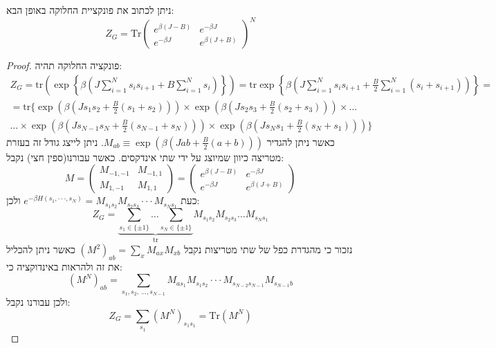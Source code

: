 \documentclass{tstextbook}
\begin{document}
\begin{proposition}
ניתן לכתוב את פונקציית החלוקה באופן הבא:
$$Z_{G}=\mathrm{Tr}\begin{pmatrix}e^{ \beta(J-B) } & e^{ -\beta J } \\e^{ -\beta J } & e^{ \beta(J+B) }
\end{pmatrix}^{N}$$

\end{proposition}
\begin{proof}
פונקציה החלוקה תהיה:
\begin{gather*}Z_{G}=\mathrm{tr}\left( \exp \left\{  \beta\left( J\sum_{i=1}^{N} s_{i}s_{i+1} + B\sum_{i=1}^{N} s_{i} \right)  \right\} \right)=\mathrm{tr} \exp\left\{\beta\left(J\sum_{i=1}^{N}s_{i}s_{i+1}+\frac{B}{2}\sum_{i=1}^{N}\left(s_{i}+s_{i+1}\right)\right)\right\}=  \\=\mathrm{tr}\Bigg\{\exp\left(\beta\left(J s_{1}s_{2}+\frac{B}{2}\left(s_{1}+s_{2}\right)\right)\right)\times\exp\left(\beta\left(J s_{2}s_{3}+\frac{B}{2}\left(s_{2}+s_{3}\right)\right)\right)\times\ldots \\\dots \times \exp\left(\beta\left(J s_{N-1}s_{N}+{\frac{B}{2}}\left(s_{N-1}+s_{N}\right)\right)\right)\times\exp\left(\beta\left(J s_{N}s_{1}+{\frac{B}{2}}\left(s_{N}+s_{1}\right)\right)\right)\Bigg\}
\end{gather*}
כאשר ניתן להגדיר \(M_{a b}\equiv\exp\left(\beta\left(J a b+{\textstyle{\frac{B}{2}}}\left(a+b\right)\right)\right)\). ניתן לייצג גודל זה בעזרת מטריצה כיוון שמיוצג על ידי שתי אינדקסים. כאשר עבורנו(ספין חצי) נקבל:
$$M=\begin{pmatrix}M_{-1,-1} & M_{-1,1} \\M_{1,-1} & M_{1,1}\end{pmatrix}=\begin{pmatrix}e^{ \beta(J-B) } & e^{ -\beta J } \\e^{ -\beta J } & e^{ \beta(J+B) }
\end{pmatrix}$$
כעת \(e^{-\beta H(s_{1},\cdot\cdot\cdot,s_{N})}=M_{s_{1}s_{2}}M_{s_{2}s_{3}}\cdot\cdot\cdot M_{s_{N}s_{1}}\) ולכן:
$$Z_{G}=\underbrace{ \sum_{s_{1}\in \{ \pm  1\}} \dots \sum_{s_{N}\in \{ \pm  1\}} }_{ \mathrm{tr} } M_{s_{1}s_{2}}M_{s_{2}s_{3}}\dots M_{s_{N}s_{1}}$$
נזכור כי מהגדרת כפל של שתי מטריצות נקבל \((M^{2})_{a b}=\sum_{x}M_{a x}M_{x b}\) כאשר ניתן להכליל את זה ולהראות באינדוקציה כי:
$$(M^{N})_{a b}=\sum_{s_{1},s_{2},\,\ldots,s_{N-1}}M_{a s_{1}}M_{s_{1}s_{2}}\cdot\cdot\cdot M_{s_{N-2}s_{N-1}}M_{s_{N-1}b}$$
ולכן עבורנו נקבל:
$$Z_{G}=\sum_{s_{1}}(M^{N})_{s_{1}s_{1}}=\mathrm{Tr}(M^{N})$$

\end{proof}
\end{document}
